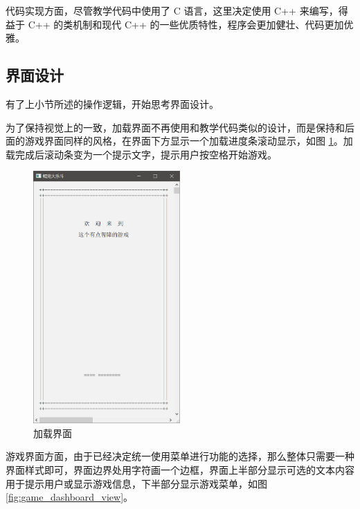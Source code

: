 \documentclass[a4paper, 11pt]{article}
\begin{document}
代码实现方面，尽管教学代码中使用了 C 语言，这里决定使用 C++ 来编写，得益于 C++ 的类机制和现代 C++ 的一些优质特性，程序会更加健壮、代码更加优雅。

\subsection{界面设计}

有了上小节所述的操作逻辑，开始思考界面设计。

为了保持视觉上的一致，加载界面不再使用和教学代码类似的设计，而是保持和后面的游戏界面同样的风格，在界面下方显示一个加载进度条滚动显示，如图 \ref{fig:loading_view}。加载完成后滚动条变为一个提示文字，提示用户按空格开始游戏。

\begin{figure}[htp]
	\centering\includegraphics[width=0.5\textwidth]{loading_view}
	\caption{加载界面}
	\label{fig:loading_view}
\end{figure}

游戏界面方面，由于已经决定统一使用菜单进行功能的选择，那么整体只需要一种界面样式即可，界面边界处用字符画一个边框，界面上半部分显示可选的文本内容用于提示用户或显示游戏信息，下半部分显示游戏菜单，如图 \ref{fig:game_dashboard_view}。
\end{document}
